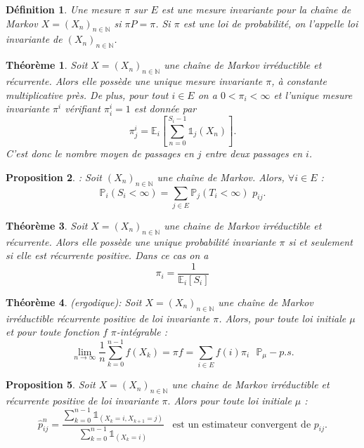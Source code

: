 \documentclass[12pt,a4paper]{report}
\newtheorem{thm}{Théorème}[section]
\newtheorem{definition}{Définition}[section]
\newtheorem{prop}[thm]{Proposition}
\theoremstyle{remark}
\begin{document}
\begin{definition}\label{def3}
Une mesure $\pi$ sur $E$ est une mesure invariante pour la chaîne de Markov
$X=(X_n)_{n \in \mathbb{N}}$ si $\pi P = \pi$. Si $\pi$ est une loi de probabilité, on l'appelle loi invariante de $(X_n)_{n \in \mathbb{N}}$.
\end{definition}
\begin{thm}\label{th6}
Soit $X=(X_n)_{n\in\mathbb{N}}$ une chaîne de Markov irréductible et récurrente. Alors elle possède une unique mesure invariante $\pi$, à constante multiplicative près. De plus, pour tout $i\in E$ on a $0<\pi_i<\infty$ et l'unique mesure invariante $\pi^i$ vérifiant $\pi_i^i=1$ est donnée par $$\pi_j^i = \mathbb{E}_i\left[\sum_{n=0}^{S_i-1}\mathds{1}_j(X_n) \right].$$
C'est donc le nombre moyen de passages en $j$ entre deux passages en $i$.
\end{thm}
\begin{prop}\label{prop1}
: Soit $(X_n)_{n \in \mathbb{N}}$ une chaîne de Markov. Alors, $\forall i \in E$ :
$$\mathbb{P}_i(S_i <\infty) = \sum\limits_{j \in E} \mathbb{P}_j(T_i < \infty) \, \, p_{ij}.$$
\end{prop}
\begin{thm}\label{th61}
Soit $X=\left(X_{n}\right)_{n \in \mathbb{N}}$ une chaine de Markov irréductible et récurrente. Alors elle possède une unique probabilité invariante $\pi$ si et seulement si elle est récurrente positive. Dans ce cas on a
$$
\pi_{i}=\frac{1}{\mathbb{E}_{i}\left[S_{i}\right]}
$$
\end{thm}

\begin{thm}\label{th4}
(ergodique): Soit $X = (X_n)_{n \in \mathbb{N}}$ une chaîne de Markov irréductible récurrente positive de loi invariante $\pi$. Alors, pour toute loi initiale $\mu$ et pour toute fonction $f \, \, \pi$-intégrable :\\
$$\lim\limits_{n \rightarrow \infty}  \frac{1}{n} \sum\limits_{k=0}^{n-1} f\left(X_{k}\right) = \pi f=\sum\limits_{i \in E} f(i) \pi_{i} \, \, \, \, \mathbb{P}_{\mu}-p.s.$$
\end{thm}
\begin{prop}\label{prop0}
Soit $X=\left(X_{n}\right)_{n \in \mathbb{N}}$ une chaine de Markov irréductible et récurrente positive de loi invariante $\pi .$ Alors pour toute loi initiale $\mu$ :
$$
\widehat{p}_{i j}^{n}=\frac{\sum_{k=0}^{n-1} \mathds{1}_{\left(X_{k}=i, X_{k+1}=j\right)}}{\sum_{k=0}^{n-1} \mathds{1}_{\left(X_{k}=i\right)}}
\, \, \, \text{ est un estimateur convergent de } p_{i j}.$$
\end{prop}
\end{document}
